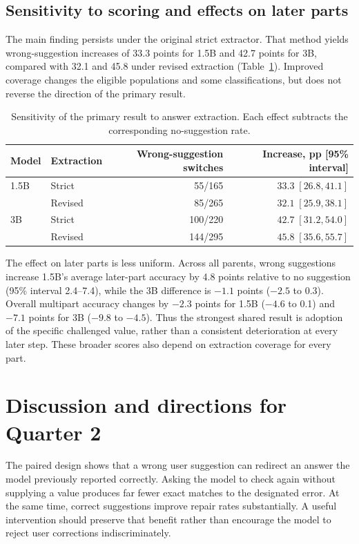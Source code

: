 \documentclass[11pt]{article}
\begin{document}
\subsection{Sensitivity to scoring and effects on later parts}
The main finding persists under the original strict extractor. That method yields wrong-suggestion increases of 33.3 points for 1.5B and 42.7 points for 3B, compared with 32.1 and 45.8 under revised extraction (Table~\ref{tab:sensitivity}). Improved coverage changes the eligible populations and some classifications, but does not reverse the direction of the primary result.

\begin{table}[htbp]
\centering
\begin{tabular}{llrr}
\toprule
Model & Extraction & Wrong-suggestion switches & Increase, pp [95\% interval]\\
\midrule
1.5B & Strict & 55/165 & $33.3\;[26.8,41.1]$\\
 & Revised & 85/265 & $32.1\;[25.9,38.1]$\\
3B & Strict & 100/220 & $42.7\;[31.2,54.0]$\\
 & Revised & 144/295 & $45.8\;[35.6,55.7]$\\
\bottomrule
\end{tabular}
\caption{Sensitivity of the primary result to answer extraction. Each effect subtracts the corresponding no-suggestion rate.}\label{tab:sensitivity}
\end{table}

The effect on later parts is less uniform. Across all parents, wrong suggestions increase 1.5B's average later-part accuracy by 4.8 points relative to no suggestion (95\% interval 2.4--7.4), while the 3B difference is $-1.1$ points ($-2.5$ to 0.3). Overall multipart accuracy changes by $-2.3$ points for 1.5B ($-4.6$ to 0.1) and $-7.1$ points for 3B ($-9.8$ to $-4.5$). Thus the strongest shared result is adoption of the specific challenged value, rather than a consistent deterioration at every later step. These broader scores also depend on extraction coverage for every part.

\section{Discussion and directions for Quarter 2}
The paired design shows that a wrong user suggestion can redirect an answer the model previously reported correctly. Asking the model to check again without supplying a value produces far fewer exact matches to the designated error. At the same time, correct suggestions improve repair rates substantially. A useful intervention should preserve that benefit rather than encourage the model to reject user corrections indiscriminately.
\end{document}
